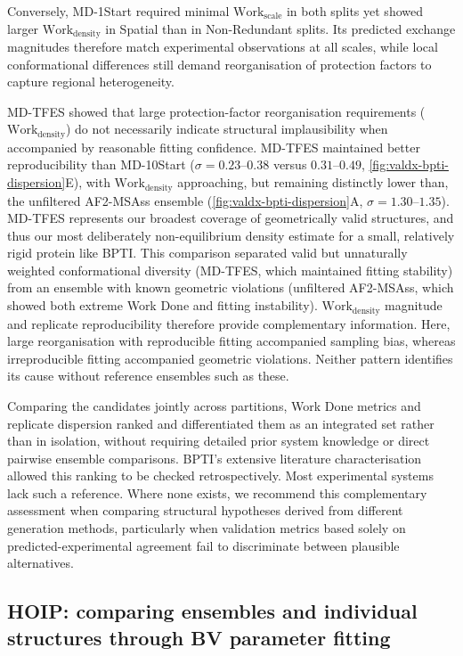 Conversely, MD-1Start required minimal $\text{Work}_\text{scale}$ in both splits yet showed larger $\text{Work}_\text{density}$ in Spatial than in Non-Redundant splits. Its predicted exchange magnitudes therefore match experimental observations at all scales, while local conformational differences still demand reorganisation of protection factors to capture regional heterogeneity.

MD-TFES showed that large protection-factor reorganisation requirements ($\text{Work}_\text{density}$) do not necessarily indicate structural implausibility when accompanied by reasonable fitting confidence. MD-TFES maintained better reproducibility than MD-10Start ($\sigma=0.23$--$0.38$ versus $0.31$--$0.49$, \cref{fig:valdx-bpti-dispersion}E), with $\text{Work}_\text{density}$ approaching, but remaining distinctly lower than, the unfiltered AF2-MSAss ensemble (\cref{fig:valdx-bpti-dispersion}A, $\sigma=1.30$--$1.35$). MD-TFES represents our broadest coverage of geometrically valid structures, and thus our most deliberately non-equilibrium density estimate for a small, relatively rigid protein like BPTI. This comparison separated valid but unnaturally weighted conformational diversity (MD-TFES, which maintained fitting stability) from an ensemble with known geometric violations (unfiltered AF2-MSAss, which showed both extreme Work Done and fitting instability). $\text{Work}_\text{density}$ magnitude and replicate reproducibility therefore provide complementary information. Here, large reorganisation with reproducible fitting accompanied sampling bias, whereas irreproducible fitting accompanied geometric violations. Neither pattern identifies its cause without reference ensembles such as these.

Comparing the candidates jointly across partitions, Work Done metrics and replicate dispersion ranked and differentiated them as an integrated set rather than in isolation, without requiring detailed prior system knowledge or direct pairwise ensemble comparisons. BPTI's extensive literature characterisation allowed this ranking to be checked retrospectively. Most experimental systems lack such a reference. Where none exists, we recommend this complementary assessment when comparing structural hypotheses derived from different generation methods, particularly when validation metrics based solely on predicted-experimental agreement fail to discriminate between plausible alternatives.

\subsection{HOIP: comparing ensembles and individual structures through BV parameter fitting}
\label{sec:valdx-hoip-parameter-fitting}

